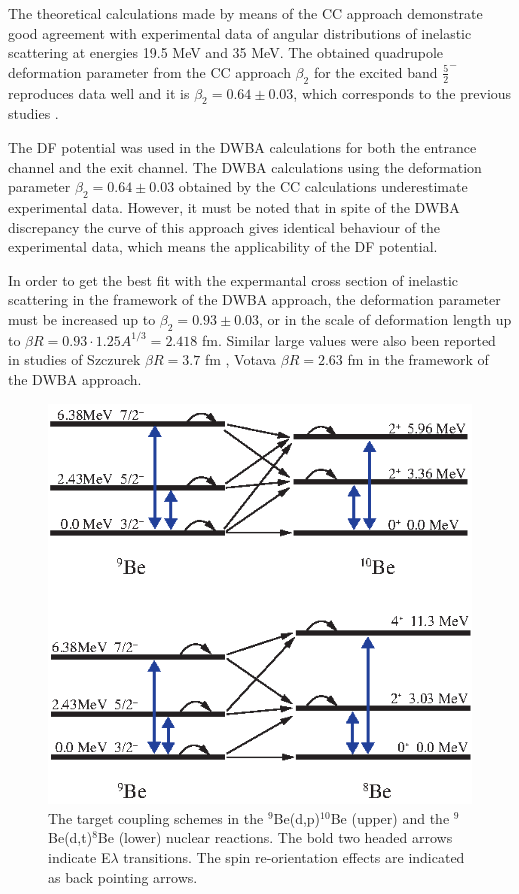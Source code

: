 \documentclass[10pt]{iopart}
\begin{document}
The theoretical calculations made by means of the CC approach demonstrate good agreement with experimental data of angular distributions of inelastic scattering at energies 19.5 MeV and 35 MeV. The obtained quadrupole deformation parameter from the CC approach $\beta_2$ for the excited band $\frac{5}{2}^-$ reproduces data well and it is $\beta_2=0.64\pm0.03$, which corresponds to the previous studies \cite{lukyanov2014, harakeh1980}.

The DF potential was used  in the DWBA calculations for both the entrance channel and the exit channel. 
The DWBA calculations using the deformation parameter $\beta_2=0.64\pm0.03$ obtained by the CC calculations underestimate experimental data. However, it must be noted that in spite of the DWBA discrepancy the curve of this approach gives identical behaviour of the experimental data, which means the applicability of the DF potential. 

In order to get the best fit with the expermantal cross section of inelastic scattering in the framework of the DWBA approach, the deformation parameter must be increased up to $\beta_2=0.93\pm0.03$, or in the scale of deformation length up to $\beta R=0.93\cdot 1.25 A^{1/3}=2.418$ fm. Similar large values were also been reported in studies of Szczurek \etal  $ \beta R=3.7$ fm \cite{bodek1989},  Votava \etal  $\beta R=2.63$ fm \cite{votava1973} in the framework of the DWBA approach.

 
\begin{figure}[bp]
\centering
\includegraphics[scale=0.85]{9BE8BECC.eps}
\caption{ \label{9BE8BECC} The target coupling schemes in the $^9$Be(d,p)$^{10}$Be (upper) and the $^9$Be(d,t)$^8$Be (lower) nuclear reactions. The bold two headed arrows indicate E$\lambda$ transitions. The spin re-orientation effects are indicated as back pointing arrows.}
\end{figure}	
\end{document}
